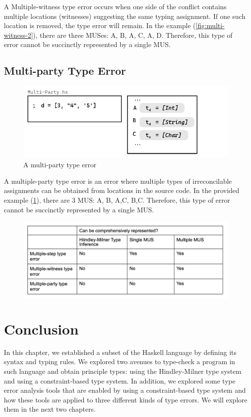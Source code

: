 A Multiple-witness type error occurs when one side of the conflict contains multiple locations (witnesses) suggesting the same typing assignment. If one such location is removed, the type error will remain. In the example (\ref{fig:multi-witness-2}), there are three MUSes: {A, B}, {A, C}, {A, D}. Therefore, this type of error cannot be succinctly represented by a single MUS. 

\subsection{Multi-party Type Error}
\begin{figure}[hbt]
  \includegraphics[width=0.5\linewidth]{Multi-Party-2}
  \caption{
    \label{fig:multi-party-2}
    A multi-party type error
  }
\end{figure}

A multiple-party type error is an error where multiple types of irreconcilable assignments can be obtained from locations in the source code. In the provided example  (\ref{fig:multi-party-2}), there are 3 MUS: {A, B}, {A,C}, {B,C}. Therefore, this type of error cannot be succinctly represented by a single MUS.

\begin{figure}[hbt]
  
  \includegraphics[width=\linewidth]{Compare}
  \caption{}
\end{figure}

\section{Conclusion}
In this chapter, we established a subset of the Haskell language by defining its syntax and typing rules. We explored two avenues to type-check a program in such language and obtain principle types: using the Hindley-Milner type system and using a constraint-based type system. In addition, we explored some type error analysis tools that are enabled by using a constraint-based type system and how these tools are applied to three different kinds of type errors. We will explore them in the next two chapters.
